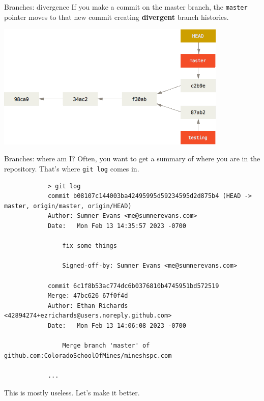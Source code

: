 \documentclass{beeper}
\begin{document}
\begin{frame}{Branches: divergence}
    If you make a commit on the master branch, the \texttt{master} pointer moves
    to that new commit creating \textbf{divergent} branch histories.

    \begin{center}
        \includegraphics[width=110mm]{graphics/branching5}
    \end{center}
\end{frame}

\begin{frame}[fragile]{Branches: where am I?}
    Often, you want to get a summary of where you are in the repository. That's
    where \texttt{git log} comes in.

    {
        \tiny
        \begin{verbatim}
            > git log
            commit b08107c144003ba42495995d59234595d2d875b4 (HEAD -> master, origin/master, origin/HEAD)
            Author: Sumner Evans <me@sumnerevans.com>
            Date:   Mon Feb 13 14:35:57 2023 -0700

                fix some things

                Signed-off-by: Sumner Evans <me@sumnerevans.com>

            commit 6c1f8b53ac774dc6b0376810b4745951bd572519
            Merge: 47bc626 67f0f4d
            Author: Ethan Richards <42894274+ezrichards@users.noreply.github.com>
            Date:   Mon Feb 13 14:06:08 2023 -0700

                Merge branch 'master' of github.com:ColoradoSchoolOfMines/mineshspc.com

            ...
        \end{verbatim}
    }
    \pause
    This is mostly useless. Let's make it better.
\end{frame}
\end{document}
